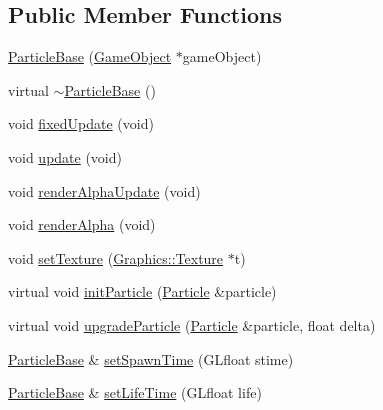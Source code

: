 \subsection*{Public Member Functions}
\begin{DoxyCompactItemize}
\item 
\mbox{\hyperlink{class_beer_engine_1_1_component_1_1_particle_base_a100f4038f049b6b6217226d0d2d8801b}{Particle\+Base}} (\mbox{\hyperlink{class_beer_engine_1_1_game_object}{Game\+Object}} $\ast$game\+Object)
\item 
virtual \mbox{\hyperlink{class_beer_engine_1_1_component_1_1_particle_base_a8dbf0b7f418ae21894d94b81ccdd7117}{$\sim$\+Particle\+Base}} ()
\item 
void \mbox{\hyperlink{class_beer_engine_1_1_component_1_1_particle_base_a17d41a2cdf9174d5f86a6773c40e4d28}{fixed\+Update}} (void)
\item 
void \mbox{\hyperlink{class_beer_engine_1_1_component_1_1_particle_base_a2aad03916144a503ca8aee36637a5f76}{update}} (void)
\item 
void \mbox{\hyperlink{class_beer_engine_1_1_component_1_1_particle_base_a0cecaefb92ed219eb0ddc2771c513446}{render\+Alpha\+Update}} (void)
\item 
void \mbox{\hyperlink{class_beer_engine_1_1_component_1_1_particle_base_ab891afa6a5b2c99ffe94691bb5419588}{render\+Alpha}} (void)
\item 
void \mbox{\hyperlink{class_beer_engine_1_1_component_1_1_particle_base_a1a97e88564d79e122a7e1ccad7c2ab93}{set\+Texture}} (\mbox{\hyperlink{class_beer_engine_1_1_graphics_1_1_texture}{Graphics\+::\+Texture}} $\ast$t)
\item 
virtual void \mbox{\hyperlink{class_beer_engine_1_1_component_1_1_particle_base_a8d42fe68ec7c27aed419cde949ac278a}{init\+Particle}} (\mbox{\hyperlink{struct_beer_engine_1_1_component_1_1_particle}{Particle}} \&particle)
\item 
virtual void \mbox{\hyperlink{class_beer_engine_1_1_component_1_1_particle_base_a5add32f7be9357ac7a16f5d9a47337d2}{upgrade\+Particle}} (\mbox{\hyperlink{struct_beer_engine_1_1_component_1_1_particle}{Particle}} \&particle, float delta)
\item 
\mbox{\hyperlink{class_beer_engine_1_1_component_1_1_particle_base}{Particle\+Base}} \& \mbox{\hyperlink{class_beer_engine_1_1_component_1_1_particle_base_a9ae9fc6ba48e3b7d1eb7296b300d2964}{set\+Spawn\+Time}} (G\+Lfloat stime)
\item 
\mbox{\hyperlink{class_beer_engine_1_1_component_1_1_particle_base}{Particle\+Base}} \& \mbox{\hyperlink{class_beer_engine_1_1_component_1_1_particle_base_a7f4789dd5c5e53652abf2083d7a8e2f9}{set\+Life\+Time}} (G\+Lfloat life)

\end{DoxyCompactItemize}
